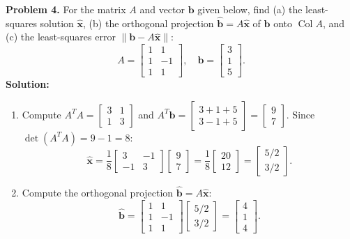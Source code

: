 \documentclass[11pt, letterpaper]{article}
\theoremstyle{definition}
\theoremstyle{remark}
\begin{document}
\textbf{Problem 4.} For the matrix $A$ and vector $\mathbf{b}$ given below, find (a) the least-squares solution $\hat{\mathbf{x}}$, (b) the orthogonal projection $\hat{\mathbf{b}} = A\hat{\mathbf{x}}$ of $\mathbf{b}$ onto $\operatorname{Col} A$, and (c) the least-squares error $\|\mathbf{b} - A\hat{\mathbf{x}}\|$:
\[
A = \begin{bmatrix} 1 & 1 \\ 1 & -1 \\ 1 & 1 \end{bmatrix}, \quad \mathbf{b} = \begin{bmatrix} 3 \\ 1 \\ 5 \end{bmatrix}.
\]
\textbf{Solution:}
\begin{enumerate}[label=(\alph*)]
    \item Compute $A^T A = \begin{bmatrix} 3 & 1 \\ 1 & 3 \end{bmatrix}$ and $A^T \mathbf{b} = \begin{bmatrix} 3+1+5 \\ 3-1+5 \end{bmatrix} = \begin{bmatrix} 9 \\ 7 \end{bmatrix}$. Since $\det(A^T A) = 9 - 1 = 8$:
    \[
    \hat{\mathbf{x}} = \frac{1}{8} \begin{bmatrix} 3 & -1 \\ -1 & 3 \end{bmatrix} \begin{bmatrix} 9 \\ 7 \end{bmatrix} = \frac{1}{8} \begin{bmatrix} 20 \\ 12 \end{bmatrix} = \begin{bmatrix} 5/2 \\ 3/2 \end{bmatrix}.
    \]
    \item Compute the orthogonal projection $\hat{\mathbf{b}} = A\hat{\mathbf{x}}$:
    \[
    \hat{\mathbf{b}} = \begin{bmatrix} 1 & 1 \\ 1 & -1 \\ 1 & 1 \end{bmatrix} \begin{bmatrix} 5/2 \\ 3/2 \end{bmatrix} = \begin{bmatrix} 4 \\ 1 \\ 4 \end{bmatrix}.
\]
\end{enumerate}
\end{document}
